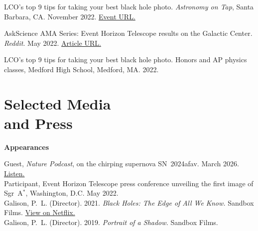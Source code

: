 \documentclass[margin,line]{res}
\begin{document}
\begin{resume}
 

\vspace*{-2mm}
LCO's top 9 tips for taking your best black hole photo. \textit{Astronomy on Tap}, Santa Barbara, CA. November 2022. {\color{blue}\href{https://astronomyontap.org/event/astronomy-on-tap-santa-barbara-2/}{Event URL.}}

\vspace*{-2mm}
AskScience AMA Series: Event Horizon Telescope results on the Galactic Center. \textit{Reddit}. May 2022. {\color{blue}\href{https://old.reddit.com/r/askscience/comments/unyg77/askscience_ama_series_were_event_horizon/}{Article URL.}}

\vspace*{-2mm}
LCO's top 9 tips for taking your best black hole photo. Honors and AP physics classes, Medford High School, Medford, MA. 2022.

\vspace{+.2cm}



\vspace{+.2cm}
\section{\sc Selected Media \\ and Press}
 
{\bf Appearances}\par
\vspace{-0.4cm}
{\leftskip=3mm \noindent
Guest, \textit{Nature Podcast}, on the chirping supernova SN~2024afav. March 2026. {\color{blue}\href{https://youtu.be/ZfJA6FJICns?t=691}{Listen.}} \\ %
Participant, Event Horizon Telescope press conference unveiling the first image of Sgr~A$^\ast$, Washington, D.C. May 2022. \\ %
Galison, P.~L. (Director). 2021. \textit{Black Holes: The Edge of All We Know.} Sandbox Films. {\color{blue}\href{https://www.netflix.com/title/81343342}{View on Netflix.}} \\
Galison, P.~L. (Director). 2019. \textit{Portrait of a Shadow.} Sandbox Films.\par}
 

\end{resume}
\end{document}
